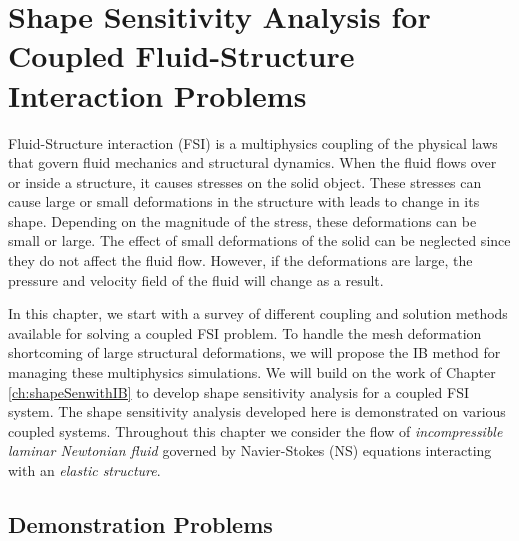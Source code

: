 \chapter{Shape Sensitivity Analysis for Coupled Fluid-Structure Interaction Problems}\label{ch:FSIsen}
Fluid-Structure interaction (FSI) is a multiphysics coupling of the physical laws that govern fluid mechanics and structural dynamics. When the fluid flows over or inside a structure, it causes stresses on the solid object. These stresses can cause large or small deformations in the structure with leads to change in its shape. Depending on the magnitude of the stress, these deformations can be small or large. The effect of small deformations of the solid can be neglected since they do not affect the fluid flow. However, if the deformations are large, the pressure and velocity field of the fluid will change as a result.

In this chapter, we start with a survey of different coupling and solution methods available for solving a coupled FSI problem. To handle the mesh deformation shortcoming of large structural deformations, we will propose the IB method for managing these multiphysics simulations. We will build on the work of Chapter \ref{ch:shapeSenwithIB} to develop shape sensitivity analysis for a coupled FSI system. The shape sensitivity analysis developed here is demonstrated on various coupled systems. Throughout this chapter we consider the flow of \emph{incompressible laminar Newtonian fluid} governed by Navier-Stokes (NS) equations interacting with an \emph{elastic structure}. 



\section{Demonstration Problems}



